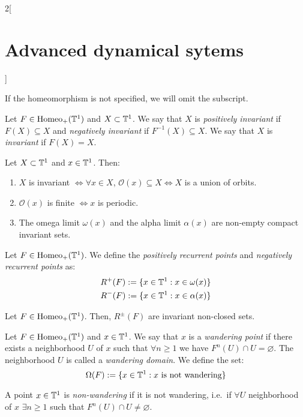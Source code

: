 \documentclass[../../../main_math.tex]{subfiles}
\begin{document}
\begin{multicols}{2}[\section{Advanced dynamical sytems}]
\begin{definition}
    If the homeomorphism is not specified, we will omit the subscript.
  \end{definition}
  \begin{definition}
    Let $F\in\mathrm{Homeo}_+(\mathbb{T}^1)$ and $X\subset \mathbb{T}^1$. We say that $X$ is \emph{positively invariant} if $F(X)\subseteq X$ and \emph{negatively invariant} if $F^{-1}(X)\subseteq X$. We say that $X$ is \emph{invariant} if $F(X)=X$.
  \end{definition}
  \begin{proposition}
    Let $X\subset \mathbb{T}^1$ and $x\in \mathbb{T}^1$. Then:
    \begin{enumerate}
      \item $X$ is invariant $\iff \forall x\in X$, $\mathcal{O}(x)\subseteq X\iff X$ is a union of orbits.
      \item $\mathcal{O}(x)$ is finite $\iff x$ is periodic.
      \item The omega limit $\omega(x)$ and the alpha limit $\alpha(x)$ are non-empty compact invariant sets.
    \end{enumerate}
  \end{proposition}
  \begin{definition}
    Let $F\in \mathrm{Homeo}_+(\mathbb{T}^1)$. We define the \emph{positively recurrent points} and \emph{negatively recurrent points} as:
    \begin{align*}
      R^+(F):=\{x\in\mathbb{T}^1:x\in\omega(x)\} \\
      R^-(F):=\{x\in\mathbb{T}^1:x\in\alpha(x)\}
    \end{align*}
  \end{definition}
  \begin{proposition}
    Let $F\in \mathrm{Homeo}_+(\mathbb{T}^1)$. Then, $R^\pm(F)$ are invariant non-closed sets.
  \end{proposition}
  \begin{definition}
    Let $F\in \mathrm{Homeo}_+(\mathbb{T}^1)$ and $x\in \mathbb{T}^1$. We say that $x$ is a \emph{wandering point} if there exists a neighborhood $U$ of $x$ such that $\forall n\geq 1$ we have $F^n(U)\cap U=\varnothing$. The neighborhood $U$ is called a \emph{wandering domain}. We define the set:
    $$
      \Omega(F):=\{ x\in\mathbb{T}^1: x\text{ is not wandering}\}
    $$
  \end{definition}
  \begin{remark}
    A point $x\in\mathbb{T}^1$ is \emph{non-wandering} if it is not wandering, i.e.\ if $\forall U$ neighborhood of $x$ $\exists n\geq 1$ such that $F^n(U)\cap U\ne\varnothing$.
  \end{remark}

\end{multicols}
\end{document}
